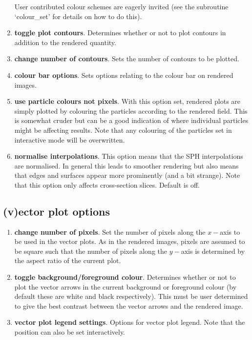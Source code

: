 \documentclass[a4paper,11pt]{article}
\begin{document}
\begin{enumerate}
 User contributed colour schemes are eagerly invited (see the subroutine
`colour\_set' for details on how to do this).

\item \textbf{toggle plot contours}. Determines whether or not to plot contours
in addition to the rendered quantity.
\item \textbf{change number of contours}. Sets the number of contours to be
plotted. 
\item \textbf{colour bar options}. Sets options relating to the colour
bar on rendered images.
\item \textbf{use particle colours not pixels}. With this option set, rendered plots are
simply plotted by colouring the particles according to the rendered field. This is somewhat
cruder but can be a good indication of where individual particles might be affecting results.
Note that any colouring of the particles set in interactive mode will be overwritten.
\item \textbf{normalise interpolations}. This option means that the SPH interpolations are
normalised. In general this leads to smoother rendering but also means that edges and surfaces appear
more prominently (and a bit strange). Note that this option only affects cross-section slices. Default is off.
\end{enumerate}

\subsection{(v)ector plot options}
\begin{enumerate}
\item \textbf{change number of pixels}. Set the number of pixels along the
$x-$axis to be used in the vector plots. As in the rendered images, pixels are assumed to be square such that the number of pixels along
the $y-$axis is determined by the aspect ratio of the current plot.
\item \textbf{toggle background/foreground colour}. Determines whether or not to
plot the vector arrows in the current background or foreground colour (by
default these are white and black respectively). This must
be user determined to give the best contrast between the vector arrows and the
rendered image.
\item \textbf{vector plot legend settings}. Options for vector plot legend. Note that the position can also be set
interactively.
\end{enumerate}
\end{document}
